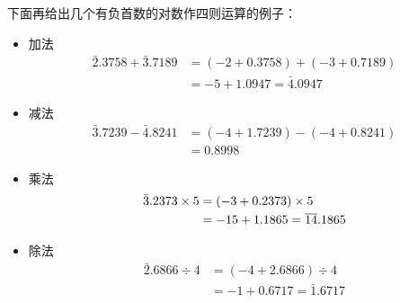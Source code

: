 下面再给出几个有负首数的对数作四则运算的例子：
\begin{itemize}
    \item 加法\[\begin{split}
    \bar{2}.3758+\bar{3}.7189&=(-2+0.3758)+(-3+0.7189)\\
&=-5+1.0947=\bar{4}.0947
\end{split}\]
    \item 减法\[\begin{split}
    \bar{3}.7239-\bar{4}.8241&=(-4+1.7239)-(-4+0.8241)\\
&=0.8998
\end{split}\]
    \item 乘法\[\begin{split}
 \bar{3}.2373\times5&=(-3+0.2373)\times5\\
&=-15+1.1865=\overline{14}.1865   
\end{split}\]
    \item 除法\[\begin{split}
\bar{2}.6866\div 4&=(-4+2.6866)\div 4\\
&=-1+0.6717=\bar{1}.6717
\end{split}\]
\end{itemize}

